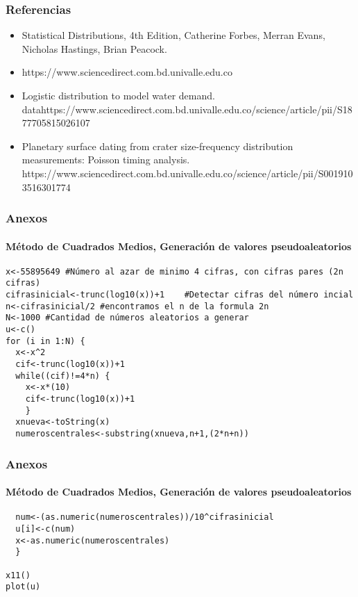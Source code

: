 \documentclass[11pt]{beamer}
\begin{document}
\begin{frame}
\frametitle{Referencias}
\begin{itemize}
\item Statistical Distributions, 4th Edition, Catherine Forbes, Merran Evans, Nicholas Hastings, Brian Peacock. 
\item https://www.sciencedirect.com.bd.univalle.edu.co
\item Logistic distribution to model water demand.                  \\datahttps://www.sciencedirect.com.bd.univalle.edu.co/science/article/pii/S1877705815026107
\item Planetary surface dating from crater size-frequency distribution measurements: Poisson timing analysis.  
 \\https://www.sciencedirect.com.bd.univalle.edu.co/science/article/pii/S0019103516301774
\end{itemize}
\end{frame}

\begin{frame}[fragile]
\frametitle{Anexos}
\framesubtitle{Método de Cuadrados Medios, Generación de valores pseudoaleatorios}
\begin{verbatim}
x<-55895649 #Número al azar de minimo 4 cifras, con cifras pares (2n cifras)  
cifrasinicial<-trunc(log10(x))+1    #Detectar cifras del número incial
n<-cifrasinicial/2 #encontramos el n de la formula 2n
N<-1000 #Cantidad de números aleatorios a generar
u<-c()
for (i in 1:N) {
  x<-x^2
  cif<-trunc(log10(x))+1
  while((cif)!=4*n) {
    x<-x*(10)
    cif<-trunc(log10(x))+1
    }
  xnueva<-toString(x)
  numeroscentrales<-substring(xnueva,n+1,(2*n+n))
\end{verbatim}
\end{frame}

\begin{frame}[fragile]
\frametitle{Anexos}
\framesubtitle{Método de Cuadrados Medios, Generación de valores pseudoaleatorios}
\begin{verbatim}
  num<-(as.numeric(numeroscentrales))/10^cifrasinicial
  u[i]<-c(num)
  x<-as.numeric(numeroscentrales)
  }

x11()
plot(u)
\end{verbatim}

\end{frame}
\end{document}

